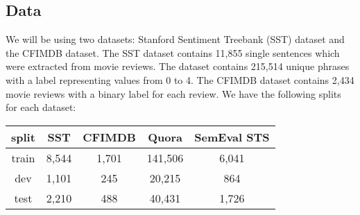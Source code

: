 \documentclass{article}
\begin{document}
\subsection{Data}
We will be using two datasets: Stanford Sentiment Treebank (SST) dataset and the CFIMDB dataset. The SST dataset contains 11,855 single sentences which were extracted from movie reviews. The dataset contains 215,514 unique phrases with a label representing values from 0 to 4. The CFIMDB dataset contains 2,434 movie reviews with a binary label for each review. We have the following splits for each dataset:

\begin{center}
\begin{tabular}{ |c|c|c|c|c| } 
 \hline
 \textbf{split} & \textbf{SST} & \textbf{CFIMDB} & \textbf{Quora} & \textbf{SemEval STS} \\
 \hline
 train & 8,544 & 1,701 & 141,506 & 6,041 \\
 \hline
 dev & 1,101 & 245 & 20,215 & 864 \\
 \hline
 test & 2,210 & 488 & 40,431 & 1,726\\  
 \hline
\end{tabular}
\end{center}
\end{document}

